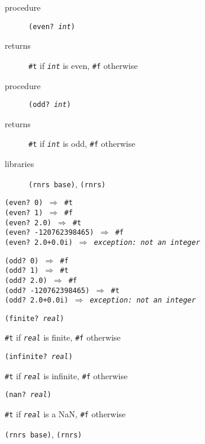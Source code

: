\begin{description}

\label{objects_s96}\item[procedure] \texttt{(even? \textit{int})}



\item[returns] \texttt{\#{}t} if \texttt{\textit{int}} is even, \texttt{\#{}f} otherwise


\item[procedure] \texttt{(odd? \textit{int})}



\item[returns] \texttt{\#{}t} if \texttt{\textit{int}} is odd, \texttt{\#{}f} otherwise


\item[libraries] \texttt{(rnrs base)}, \texttt{(rnrs)}
\end{description}


\begin{alltt}
(even? 0) \(\Rightarrow\) \#{}t
(even? 1) \(\Rightarrow\) \#{}f
(even? 2.0) \(\Rightarrow\) \#{}t
(even? -120762398465) \(\Rightarrow\) \#{}f
(even? 2.0+0.0i) \(\Rightarrow\) \textit{exception: not an integer}

(odd? 0) \(\Rightarrow\) \#{}f
(odd? 1) \(\Rightarrow\) \#{}t
(odd? 2.0) \(\Rightarrow\) \#{}f
(odd? -120762398465) \(\Rightarrow\) \#{}t
(odd? 2.0+0.0i) \(\Rightarrow\) \textit{exception: not an integer}
\end{alltt}

\begin{description}

\label{objects_s97}\item[procedure] \texttt{(finite? \textit{real})}



\item[returns] \texttt{\#{}t} if \texttt{\textit{real}} is finite, \texttt{\#{}f} otherwise


\item[procedure] \texttt{(infinite? \textit{real})}



\item[returns] \texttt{\#{}t} if \texttt{\textit{real}} is infinite, \texttt{\#{}f} otherwise


\item[procedure] \texttt{(nan? \textit{real})}



\item[returns] \texttt{\#{}t} if \texttt{\textit{real}} is a NaN, \texttt{\#{}f} otherwise


\item[libraries] \texttt{(rnrs base)}, \texttt{(rnrs)}
\end{description}



